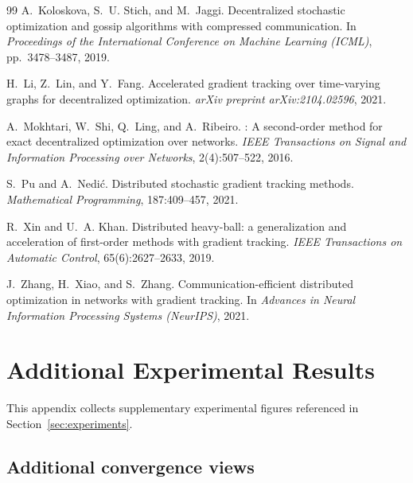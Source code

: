 \documentclass[10pt,twocolumn,letterpaper]{article}
\theoremstyle{compact}
\theoremstyle{compactremark}
\begin{document}
{\begin{thebibliography}{99}
		A.~Koloskova, S.~U. Stich, and M.~Jaggi.
		\newblock Decentralized stochastic optimization and gossip algorithms with compressed communication.
		\newblock In \emph{Proceedings of the International Conference on Machine Learning (ICML)}, pp.~3478--3487, 2019.
		
		H.~Li, Z.~Lin, and Y.~Fang.
		\newblock Accelerated gradient tracking over time-varying graphs for decentralized optimization.
		\newblock \emph{arXiv preprint arXiv:2104.02596}, 2021.
		
		A.~Mokhtari, W.~Shi, Q.~Ling, and A.~Ribeiro.
		: A second-order method for exact decentralized optimization over networks.
		\newblock \emph{IEEE Transactions on Signal and Information Processing over Networks}, 2(4):507--522, 2016.
		
		S.~Pu and A.~Nedi{\'c}.
		\newblock Distributed stochastic gradient tracking methods.
		\newblock \emph{Mathematical Programming}, 187:409--457, 2021.
		
		R.~Xin and U.~A. Khan.
		\newblock Distributed heavy-ball: a generalization and acceleration of first-order methods with gradient tracking.
		\newblock \emph{IEEE Transactions on Automatic Control}, 65(6):2627--2633, 2019.
		
		J.~Zhang, H.~Xiao, and S.~Zhang.
		\newblock Communication-efficient distributed optimization in networks with gradient tracking.
		\newblock In \emph{Advances in Neural Information Processing Systems (NeurIPS)}, 2021.
		
	\end{thebibliography}
}

\appendix
\footnotesize

\section{Additional Experimental Results}\label{app:extra_exp}

This appendix collects supplementary experimental figures referenced in Section~\ref{sec:experiments}.

\subsection{Additional convergence views}
\end{document}
